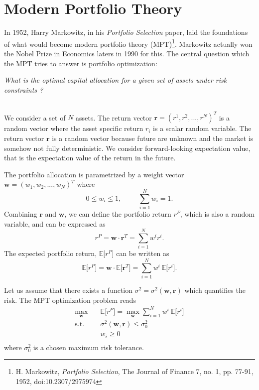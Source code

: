 \documentclass[a4paper,12pt]{report}
\begin{document}


\chapter{Modern Portfolio Theory}
In 1952, Harry Markowitz, in his \emph{Portfolio Selection} paper, laid the foundations of what would become modern portfolio theory (MPT)\footnote{H. Markowitz, \emph{Portfolio Selection}, The Journal of Finance 7, no. 1, pp. 77-91, 1952, doi:10.2307/2975974}. Markowitz actually won the Nobel Prize in Economics laters in 1990 for this. The central question which the MPT tries to answer is portfolio optimization: 
\begin{center}
\emph{What is the optimal capital allocation for a given set of assets under risk constraints ?}
\end{center}
\mbox{}\\


We consider a set of $N$ assets. The return vector $\mathbf{r} = (r^1, r^2, ..., r^N)^T$ is a random vector where the asset specific return $r_i$ is a scalar random variable. The return vector $\mathbf{r}$ is a random vector because future are unknown and the market is somehow not fully deterministic. We consider forward-looking expectation value, that is the expectation value of the return in the future.

The portfolio allocation is parametrized by a weight vector $\mathbf{w} = (w_1, w_2, ..., w_N)^T$ where
\begin{equation}
0 \leq w_i \leq 1, \hspace{1cm}\sum_{i=1}^N w_i = 1.
\end{equation}
Combining $\mathbf{r}$ and $\mathbf{w}$, we can define the portfolio return $r^P$, which is also a random variable, and can be expressed as
\begin{equation}
r^P = \mathbf{w} \cdot \mathbf{r}^T  = \sum_{i=1}^N w^i r^i.
\end{equation}
The expected portfolio return, $\mathbb{E}\big[r^P\big]$ can be written as
\begin{equation}
\mathbb{E}\big[r^P\big] = \mathbf{w} \cdot \mathbb{E}\big[\mathbf{r}^T\big] = \sum_{i=1}^N w^i ~ \mathbb{E}\big[r^i\big].
\end{equation}

\newpage
Let us assume that there exists a function $\sigma^2 = \sigma^2(\mathbf{w}, \mathbf{r})$ which quantifies the risk. The MPT optimization problem reads
\begin{equation}
\label{eq:MPT_Theory}
\begin{aligned}
\max_{\mathbf{w}} \quad & \mathbb{E}\big[r^P\big] = \max_{\mathbf{w}} \sum_{i=1}^N w^i ~ \mathbb{E}\big[r^i\big]\\
\textrm{s.t.} \quad & \sigma^2(\mathbf{w}, \mathbf{r}) \leq \sigma_0^2\\
  & w_i \geq 0    \\
\end{aligned}
\end{equation}
where $\sigma_0^2$ is a chosen maximum risk tolerance.\\
\end{document}
